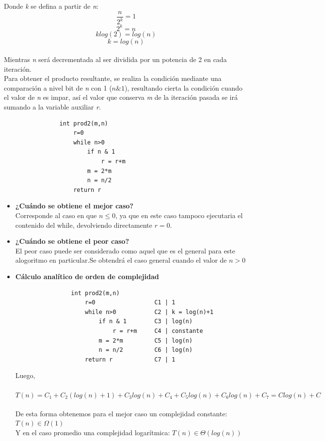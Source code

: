 \documentclass{report}
\begin{document}
            Donde \textit{k} se defina a partir de \textit{n}:
            $$\frac{n}{2^k} = 1$$
            $$2^k=n$$
            $$klog(2)=log(n)$$
            $$k=log(n)$$\\
            
            Mientras \textit{n} será decrementada al ser dividida por un potencia de 2 en cada iteración.\\
            
            Para obtener el producto resultante, se realiza la condición mediante una comparación a nivel bit de \textit{n} con 1 ($n\&1$), resultando cierta la condición cuando el valor de \textit{n} es impar, así el valor que conserva \textit{m} de la iteración pasada se irá sumando a la variable auxiliar \textit{r}.
            \begin{verbatim}
                int prod2(m,n)
                    r=0
                    while n>0
                        if n & 1
                            r = r+m
                        m = 2*m
                        n = n/2
                    return r
            \end{verbatim}
            \begin{itemize}
                \item\textbf{¿Cu\'ando se obtiene el mejor caso?}\\
                Corresponde al caso en que $n\leq 0$, ya que en este caso tampoco ejecutaria el contenido del while, devolviendo directamente $r=0$.
                \item\textbf{¿Cu\'ando se obtiene el peor caso?}\\
                El peor caso puede ser considerado como aquel que es el general para este alogoritmo en particular.Se obtendrá el caso general cuando el valor de $n>0$ 
                \item\textbf{C\'alculo anal\'itico de orden de complejidad}
                \begin{verbatim}
                int prod2(m,n)
                    r=0                 C1 | 1
                    while n>0           C2 | k = log(n)+1
                        if n & 1        C3 | log(n)
                            r = r+m     C4 | constante
                        m = 2*m         C5 | log(n)
                        n = n/2         C6 | log(n)
                    return r            C7 | 1
                \end{verbatim}
                Luego,\\\\ $T(n) = C_{1}+C_{2}(log(n)+1)+C_{3}log(n)+C_{4}+C_{5}log(n)+C_{6}log(n)+C_{7}=Clog(n)+C$\\\\
                De esta forma obtenemos para el mejor caso un complejidad constante: $T(n) \in \Omega(1)$\\
                Y en el caso promedio una complejidad logarítmica: $T(n) \in \Theta(log(n))$ \\
            \end{itemize}
            
\end{document}
